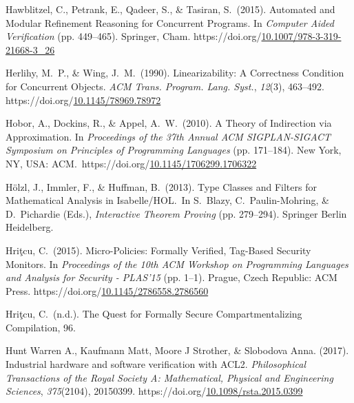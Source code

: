 \documentclass[12pt,twoside]{article}
\begin{document}
{\begin{thebibliography}{222}
\mdbibitemlabel{}Hawblitzel, C., Petrank, E., Qadeer, S., \& Tasiran, S.~(2015). Automated and Modular Refinement Reasoning for Concurrent Programs. In \emph{Computer Aided Verification} (pp. 449–465). Springer, Cham. https://doi.org/\href{https://dx.doi.org/10.1007/978-3-319-21668-3_26}{10.1007/978-3-319-21668-3\_26}\label{hawblitzel_automated_2015}%

\mdbibitemlabel{}Herlihy, M.~P., \& Wing, J.~M.~(1990). Linearizability: A Correctness Condition for Concurrent Objects. \emph{ACM Trans. Program. Lang. Syst.}, \emph{12}(3), 463–492. https://doi.org/\href{https://dx.doi.org/10.1145/78969.78972}{10.1145/78969.78972}\label{herlihy_linearizability:_1990}%

\mdbibitemlabel{}Hobor, A., Dockins, R., \& Appel, A.~W.~(2010). A Theory of Indirection via Approximation. In \emph{Proceedings of the 37th Annual ACM SIGPLAN-SIGACT Symposium on Principles of Programming Languages} (pp. 171–184). New York, NY, USA: ACM.~https://doi.org/\href{https://dx.doi.org/10.1145/1706299.1706322}{10.1145/1706299.1706322}\label{hobor_theory_2010}%

\mdbibitemlabel{}Hölzl, J., Immler, F., \& Huffman, B.~(2013). Type Classes and Filters for Mathematical Analysis in Isabelle/HOL.~In S.~Blazy, C.~Paulin-Mohring, \& D.~Pichardie (Eds.), \emph{Interactive Theorem Proving} (pp. 279–294). Springer Berlin Heidelberg.\label{holzl_type_2013}%

\mdbibitemlabel{}Hriţcu, C.~(2015). Micro-Policies: Formally Verified, Tag-Based Security Monitors. In \emph{Proceedings of the 10th ACM Workshop on Programming Languages and Analysis for Security - PLAS’15} (pp. 1–1). Prague, Czech Republic: ACM Press. https://doi.org/\href{https://dx.doi.org/10.1145/2786558.2786560}{10.1145/2786558.2786560}\label{hritcu_micro-policies:_2015}%

\mdbibitemlabel{}Hriţcu, C.~(n.d.). The Quest for Formally Secure Compartmentalizing Compilation, 96.\label{hritcu_quest_nodate}%

\mdbibitemlabel{}Hunt Warren A., Kaufmann Matt, Moore J Strother, \& Slobodova Anna. (2017). Industrial hardware and software verification with ACL2. \emph{Philosophical Transactions of the Royal Society A: Mathematical, Physical and Engineering Sciences}, \emph{375}(2104), 20150399. https://doi.org/\href{https://dx.doi.org/10.1098/rsta.2015.0399}{10.1098/rsta.2015.0399}\label{hunt_warren_a._industrial_2017}%


\end{thebibliography}}
\end{document}
